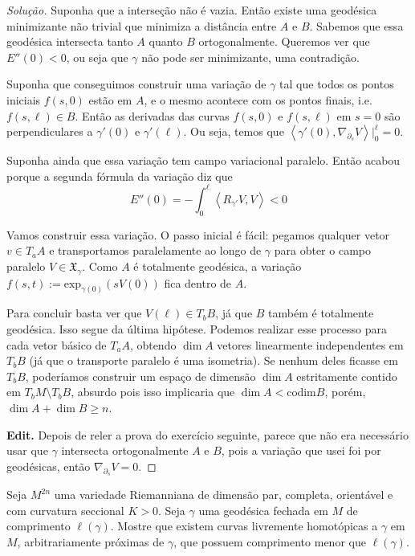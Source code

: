 \documentclass{book}
\begin{document}
\begin{proof}[Solução]
Suponha que a interseção não é vazia. Então
existe uma geodésica minimizante não
trivial que minimiza a distância entre $A$ e
$B$. Sabemos que essa geodésica
intersecta tanto $A$ quanto $B$
ortogonalmente. Queremos ver que $E''(0)<0$,
ou
seja que $\gamma$ não pode ser minimizante,
uma contradição.

Suponha que conseguimos construir uma
variação de $\gamma$ tal que todos os
pontos iniciais $f(s,0)$ estão em $A$, e o
mesmo acontece com os pontos finais,
i.e. $f(s,\ell) \in B$. Então as derivadas
das curvas $f(s,0)$ e $f(s,\ell)$ em
$s=0$ são perpendiculares a  $\gamma'(0)$ e
$\gamma'(\ell)$. Ou seja, temos que
$\left\langle{}\gamma'(0),\nabla_{\partial_s}
V\right\rangle{}|_{0}^\ell=0$.

Suponha ainda que essa variação tem campo
variacional paralelo. Então acabou
porque a segunda fórmula da variação diz que
\[E''(0)=-\int_0^\ell
\left\langle{}R_{\gamma'}V,V\right\rangle{}<0\]

Vamos construir essa variação. O passo
inicial é fácil: pegamos qualquer vetor
$v \in T_a A$ e transportamos paralelamente
ao longo de $\gamma$ para obter o
campo paralelo $V \in \mathfrak{X}_\gamma$.
Como $A$ é totalmente geodésica, a
variação
$f(s,t):=\text{exp}_{\gamma(0)}(sV(0))$ fica
dentro de $A$.

Para concluir basta ver que $ V(\ell) \in
T_bB$, já que $B$ também é totalmente
geodésica. Isso segue da última hipótese.
Podemos realizar esse processo para
cada vetor básico de  $T_a A$, obtendo $\dim
A$ vetores linearmente
independentes em $T_bB$ (já que o transporte
paralelo é uma isometria). Se
nenhum deles ficasse em $T_bB$, poderíamos
construir um espaço de dimensão $\dim
A$ estritamente contido em $T_b M\setminus
T_b B$, absurdo pois isso implicaria
que $\dim A< \text{codim} B$, porém, $\dim A+
\dim B \geq n$.

\textbf{Edit.} Depois de reler a prova do
exercício seguinte, parece que não era
necessário usar que $\gamma$ intersecta
ortogonalmente $A$ e $B$, pois a
variação que usei foi por geodésicas, então
$\nabla_{\partial_s}V=0$.
\end{proof}

\begin{exercise}
\label{exercise-free-homotopy-variation}
Seja $M^{2n}$ uma variedade Riemanniana de
dimensão par, completa, orientável e
com curvatura seccional $K>0$. Seja $\gamma$
uma geodésica fechada em $M$ de
comprimento $\ell(\gamma)$. Mostre que
existem curvas livremente homotópicas a
$\gamma$ em $M$, arbitrariamente próximas de
$\gamma$, que possuem comprimento
menor que $\ell(\gamma)$.
\end{exercise}
\end{document}

